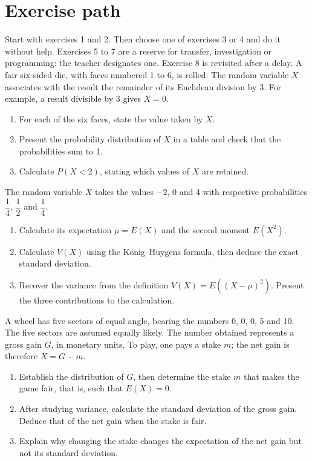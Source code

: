 \section*{Exercise path}\label{C08-PARC}
Start with exercises 1 and 2. Then choose one of exercises 3 or 4 and do it without help. Exercises 5 to 7 are a reserve for transfer, investigation or programming: the teacher designates one. Exercise 8 is revisited after a delay.
\begingroup
{}
A fair six-sided die, with faces numbered 1 to 6, is rolled. The random variable $X$ associates with the result the remainder of its Euclidean division by 3. For example, a result divisible by 3 gives $X=0$.
\begin{enumerate}[label=\arabic*.]
\item For each of the six faces, state the value taken by $X$.
\item Present the probability distribution of $X$ in a table and check that the probabilities sum to 1.
\item Calculate $P(X<2)$, stating which values of $X$ are retained.
\end{enumerate}
The random variable $X$ takes the values $-2$, 0 and 4 with respective probabilities $\dfrac14$, $\dfrac12$ and $\dfrac14$.
\begin{enumerate}[label=\arabic*.]
\item Calculate its expectation $\mu=E(X)$ and the second moment $E(X^2)$.
\item Calculate $V(X)$ using the König--Huygens formula, then deduce the exact standard deviation.
\item Recover the variance from the definition $V(X)=E((X-\mu)^2)$. Present the three contributions to the calculation.
\end{enumerate}
A wheel has five sectors of equal angle, bearing the numbers 0, 0, 0, 5 and 10. The five sectors are assumed equally likely. The number obtained represents a gross gain $G$, in monetary units. To play, one pays a stake $m$; the net gain is therefore $X=G-m$.
\begin{enumerate}[label=\arabic*.]
\item Establish the distribution of $G$, then determine the stake $m$ that makes the game fair, that is, such that $E(X)=0$.
\item After studying variance, calculate the standard deviation of the gross gain. Deduce that of the net gain when the stake is fair.
\item Explain why changing the stake changes the expectation of the net gain but not its standard deviation.
\end{enumerate}
